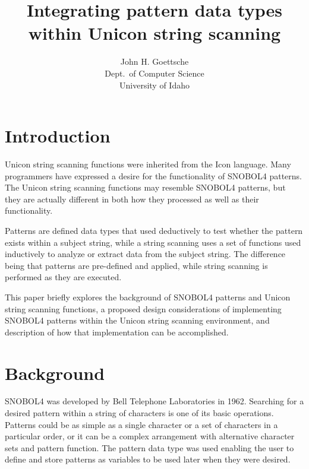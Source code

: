 \documentclass{article}
\begin{document}
\title{Integrating pattern data types within Unicon string scanning}
\author{John H. Goettsche\\
  Dept.\ of Computer Science\\
  University of Idaho}

\maketitle

\begin{abstract}


\end{abstract}

\section{Introduction}

Unicon string scanning functions were inherited from the Icon language.  Many programmers have expressed a desire for the functionality of SNOBOL4 patterns.  \cite{Griswold1980}  The Unicon string scanning functions may resemble SNOBOL4 patterns, but they are actually different in both how they processed as well as their functionality.  

Patterns are defined data types that used deductively to test whether the pattern exists within a subject string, while a string scanning uses a set of functions used inductively to analyze or extract data from the subject string.  The difference being that patterns are pre-defined and applied, while string scanning is performed as they are executed.

This paper briefly explores the background of SNOBOL4 patterns and Unicon string scanning functions, a proposed design considerations of implementing SNOBOL4 patterns within the Unicon string scanning environment, and description of how that implementation can be accomplished. 

\section{Background}

SNOBOL4 was developed by Bell Telephone Laboratories in 1962.  Searching for a desired pattern within a string of characters is one of its basic operations.  Patterns could be as simple as a single character or a set of characters in a particular order, or it can be a complex arrangement with alternative character sets and pattern function.  The pattern data type was used enabling the user to define and store patterns as variables to be used later when they were desired.\cite{Snobol}
\end{document}
